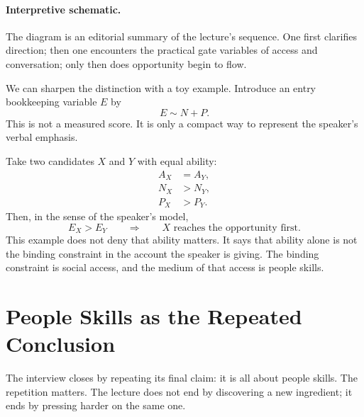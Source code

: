 \begin{figure}[h]
\centering
{}
\end{figure}

\paragraph{Interpretive schematic.}
The diagram is an editorial summary of the lecture's sequence. One first clarifies direction; then one encounters the practical gate variables of access and conversation; only then does opportunity begin to flow.

We can sharpen the distinction with a toy example. Introduce an entry bookkeeping variable \(E\) by
\begin{equation}
E \sim N + P.
\end{equation}
This is not a measured score. It is only a compact way to represent the speaker's verbal emphasis.

Take two candidates \(X\) and \(Y\) with equal ability:
\begin{align}
A_X &= A_Y,\\
N_X &> N_Y,\\
P_X &> P_Y.
\end{align}
Then, in the sense of the speaker's model,
\begin{equation}
E_X > E_Y \qquad \Longrightarrow \qquad X \text{ reaches the opportunity first.}
\end{equation}
This example does not deny that ability matters. It says that ability alone is not the binding constraint in the account the speaker is giving. The binding constraint is social access, and the medium of that access is people skills.

\section{People Skills as the Repeated Conclusion}

The interview closes by repeating its final claim: it is all about people skills. The repetition matters. The lecture does not end by discovering a new ingredient; it ends by pressing harder on the same one.

